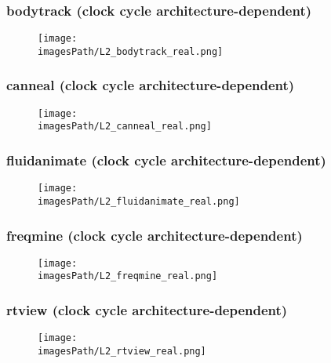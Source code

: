 \documentclass[12pt,a4paper]{article}
\newcommand{\imagesPath}{parsec-3.0/parsec_workspace/graphs}
\begin{document}
			\subsubsection{bodytrack (clock cycle architecture-dependent)}
				\begin{figure}[H]
					\begin{center}
						\texttt{[image: \\imagesPath/L2\_bodytrack\_real.png]}
					\end{center}
				\end{figure}
						
			\subsubsection{canneal (clock cycle architecture-dependent)}
				\begin{figure}[H]
					\begin{center}
						\texttt{[image: \\imagesPath/L2\_canneal\_real.png]}
					\end{center}
				\end{figure}
						
			\subsubsection{fluidanimate (clock cycle architecture-dependent)}
				\begin{figure}[H]
					\begin{center}
						\texttt{[image: \\imagesPath/L2\_fluidanimate\_real.png]}
					\end{center}
				\end{figure}
						
			\subsubsection{freqmine (clock cycle architecture-dependent)}
				\begin{figure}[H]
					\begin{center}
						\texttt{[image: \\imagesPath/L2\_freqmine\_real.png]}
					\end{center}
				\end{figure}
						
			\subsubsection{rtview (clock cycle architecture-dependent)}
				\begin{figure}[H]
					\begin{center}
						\texttt{[image: \\imagesPath/L2\_rtview\_real.png]}
					\end{center}
				\end{figure}
						
\end{document}

